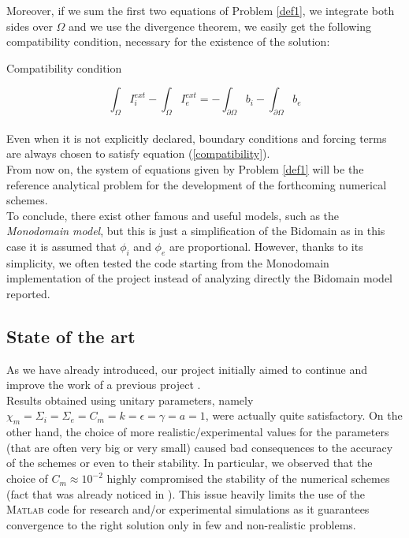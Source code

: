 \documentclass[a4paper,11pt]{article}
\begin{document}
    \vspace{4mm}
    \noindent Moreover, if we sum the first two equations of Problem \ref{def1}, we integrate both sides over $\Omega $ and we use the divergence theorem, we easily get the following compatibility condition, necessary for the existence of the solution: \\
    \begin{mycapequ}[!ht]
    	\caption{Compatibility condition}
    \end{mycapequ}
    \begin{equation} \label{compatibility}
    \int_{\Omega} I_i^{ext} - \int_{\Omega} I_e^{ext} = -\int_{\partial \Omega} b_i - \int_{\partial \Omega} b_e
    \end{equation} \vspace{3mm} \\
    Even when it is not explicitly declared, boundary conditions and forcing terms are always chosen to satisfy equation (\ref{compatibility}). \\
    

    \noindent From now on, the system of equations given by Problem \ref{def1} will be the reference analytical problem for the development of the forthcoming numerical schemes.\\
    To conclude, there exist other famous and useful models, such as the \emph{Monodomain model}, but this is just a simplification of the Bidomain as in this case it is assumed that $\phi_i$ and $\phi_e$ are proportional. However, thanks to its simplicity, we often tested the code starting from the Monodomain implementation of the project \cite{andreotti} instead of analyzing directly the Bidomain model reported.

    \subsection{State of the art}\label{past}
    As we have already introduced, our project initially aimed to continue and improve the work of a previous project \cite{marta}. \\
    Results obtained using unitary parameters, namely $\chi_m =\Sigma_i= \Sigma_e= C_m= k = \epsilon= \gamma= a=1$, were actually quite satisfactory. On the other hand, the choice of more realistic/experimental values for the parameters (that are often very big or very small) caused bad consequences to the accuracy of the schemes or even to their stability. In particular, we observed that the choice of $C_m \approx 10^{-2}$ highly compromised the stability of the numerical schemes (fact that was already noticed in \cite{andreotti}).
    This issue heavily limits the use of the \textsc{Matlab} code for research and/or experimental simulations as it guarantees convergence to the right solution only in few and non-realistic problems.  \\
\end{document}
